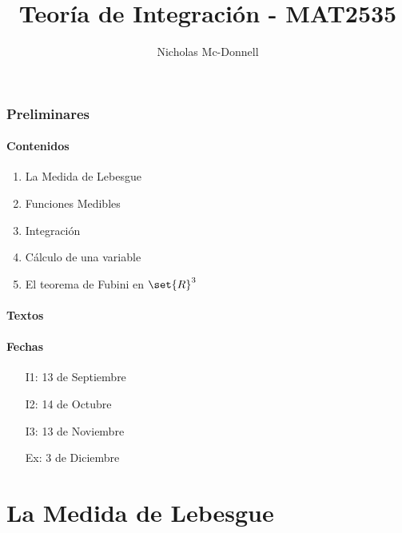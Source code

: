 \documentclass{notetaking}
\title{Teoría de Integración - MAT2535}
\author{Nicholas Mc-Donnell}
\date{}
\begin{document}
\maketitle
\tableofcontents
\newpage

\section*{Preliminares}
\subsection*{Contenidos}
\begin{enumerate}
    \item La Medida de Lebesgue
    \item Funciones Medibles
    \item Integración
    \item Cálculo de una variable
    \item El teorema de Fubini en \(\set{R}^3\)
\end{enumerate}
\subsection*{Textos}
\subsection*{Fechas}
\begin{itemize}
    \item[I1:] 13 de Septiembre
    \item[I2:] 14 de Octubre
    \item[I3:] 13 de Noviembre
    \item[Ex:] 3 de Diciembre
\end{itemize}
\newpage
\part{La Medida de Lebesgue}
\section{}
\end{document}
